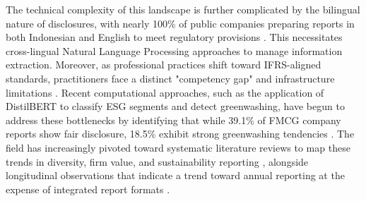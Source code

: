 The technical complexity of this landscape is further complicated by the bilingual nature of disclosures, with nearly 100\% of public companies preparing reports in both Indonesian and English to meet regulatory provisions  \parencite{tri_siwi_nugrahani_056a6914}. This necessitates cross-lingual Natural Language Processing approaches to manage information extraction. Moreover, as professional practices shift toward IFRS-aligned standards, practitioners face a distinct "competency gap" and infrastructure limitations  \parencite{amrie_firmansyah_fd5249a2}. Recent computational approaches, such as the application of DistilBERT to classify ESG segments and detect greenwashing, have begun to address these bottlenecks by identifying that while 39.1\% of FMCG company reports show fair disclosure, 18.5\% exhibit strong greenwashing tendencies  \parencite{anisa_kusuma_putri_4109a23b}. The field has increasingly pivoted toward systematic literature reviews to map these trends in diversity, firm value, and sustainability reporting  \parencite{irma_hidayati_373b816a}, alongside longitudinal observations that indicate a trend toward annual reporting at the expense of integrated report formats  \parencite{kostiantyn_bezverkhyi_e3819b1b}.

